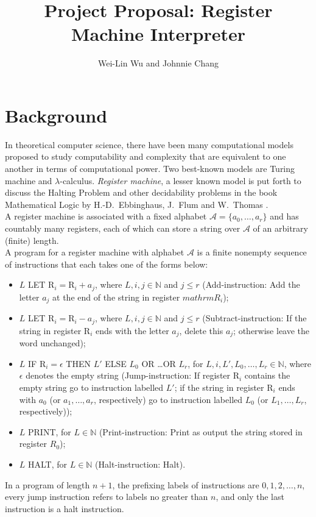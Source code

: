 \documentclass[english]{article}
\begin{document}
\title{Project Proposal: Register Machine Interpreter}

\author{Wei-Lin Wu and Johnnie Chang}

\maketitle
\thispagestyle{fancy}


\section{Background}
In theoretical computer science, there have been many computational models proposed 
to study computability and complexity that are equivalent to one another in terms of computational power. 
Two best-known models are Turing machine and $\lambda$-calculus. 
\emph{Register machine}, a lesser known model is put forth to discuss the Halting Problem 
and other decidability problems in the book Mathematical Logic by H.-D.\ Ebbinghaus, J.\ Flum and W.\ Thomas \cite{ebbinghaus2013mathematical}.
\medskip\\
A register machine is associated with a fixed alphabet $\mathcal{A} = \{a_0, \ldots, a_r\}$ and has countably many registers, 
each of which can store a string over $\mathcal{A}$ of an arbitrary (finite) length.
\medskip\\
A program for a register machine with alphabet $\mathcal{A}$ is a finite nonempty sequence of instructions that each takes one of the forms below:
\begin{itemize}
\item $L$ LET $\mathrm{R}_i = \mathrm{R}_i + a_j$, where $L, i, j \in \mathbb{N}$ and $j \leq r$ (Add-instruction: Add the letter $a_j$ at the end of the string in register $mathrm{R}_i$);
\item $L$ LET $\mathrm{R}_i = \mathrm{R}_i - a_j$, where $L, i, j \in \mathbb{N}$ and $j \leq r$ (Subtract-instruction: If the string in register $\mathrm{R}_i$ ends with the letter $a_j$, delete this $a_j$; otherwise leave the word unchanged);
\item $L$ IF $\mathrm{R}_i = \epsilon$ THEN $L'$ ELSE $L_0$ OR \ldots OR $L_r$, for $L, i, L', L_0, \ldots , L_r \in \mathbb{N}$, where $\epsilon$ denotes the empty string (Jump-instruction: If register $\mathrm{R}_i$ contains the empty string go to instruction labelled $L'$; if the string in register $\mathrm{R}_i$ ends with $a_0$ (or $a_1, \ldots, a_r$, respectively) go to instruction labelled $L_0$ (or $L_1, \ldots, L_r$, respectively));
\item $L$ PRINT, for $L \in \mathbb{N}$ (Print-instruction: Print as output the string stored in register
$R_0$);
\item $L$ HALT, for $L \in \mathbb{N}$ (Halt-instruction: Halt).
\end{itemize}
In a program of length $n + 1$, the prefixing labels of instructions are $0, 1, 2, \ldots, n$, 
every jump instruction refers to labels no greater than $n$, and only the last instruction is a halt instruction.
\end{document}
